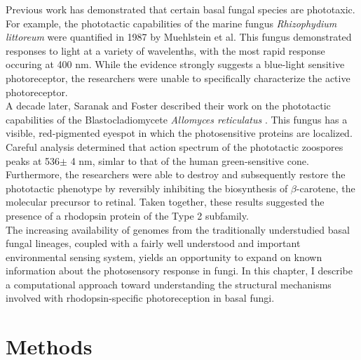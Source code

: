 \indent Previous work has demonstrated that certain basal fungal species are phototaxic. For example, the phototactic capabilities of the marine fungus \textit{Rhizophydium littoreum} were quantified in 1987 by Muehlstein et al. \nocite{Muehlstein1987} This fungus demonstrated responses to light at a variety of wavelenths, with the most rapid response occuring at 400 nm. While the evidence strongly suggests a blue-light sensitive photoreceptor, the researchers were unable to specifically characterize the active photoreceptor.\\
\indent A decade later, Saranak and Foster described their work on the phototactic capabilities of the Blastocladiomycete \textit{Allomyces reticulatus} \cite{Saranak1997}. This fungus has a visible, red-pigmented eyespot in which the photosensitive proteins are localized. Careful analysis determined that action spectrum of the phototactic zoospores peaks at 536$\pm$ 4 nm, simlar to that of the human green-sensitive cone. Furthermore, the researchers were able to destroy and subsequently restore the phototactic phenotype by reversibly inhibiting the biosynthesis of $\beta$-carotene, the molecular precursor to retinal. Taken together, these results suggested the presence of a rhodopsin protein of the Type 2 subfamily.\\
\indent The increasing availability of genomes from the traditionally understudied basal fungal lineages, coupled with a fairly well understood and important environmental sensing system, yields an opportunity to expand on known information about the photosensory response in fungi. In this chapter, I describe a computational approach toward understanding the structural mechanisms involved with rhodopsin-specific photoreception in basal fungi.\\

\section{Methods}

